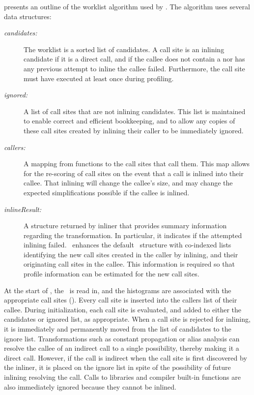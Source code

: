  presents an outline of the worklist
algorithm used by \FDI.  The algorithm uses several data structures:
\begin{description}

\item[{\it candidates:}] \hspace{15,5 pt}
  The worklist is a sorted list of candidates.
  A call site is an inlining candidate if it is a direct call, and if
  the callee does not contain a  nor has any previous
  attempt to inline the callee failed.  Furthermore, the call site
  must have executed at least once during profiling.

\item[{\it ignored:}] \hspace{5 pt}
  A list of call sites that are not inlining
  candidates.  This list is maintained to enable correct and efficient
  bookkeeping, and to allow any copies of these call sites created by
  inlining their caller to be immediately ignored.

\item[{\it callers:}] \hspace{2 pt}
  A mapping from functions to the call sites that
  call them.  This map allows for the re-scoring of call sites on the
  event that a call is inlined into their callee.  That inlining will
  change the callee's size, and may change the expected
  simplifications possible if the callee is inlined.

\item[{\it inlineResult:}] \hspace{19,5 pt}
  A structure returned by inliner that
  provides summary information regarding the transformation.  In
  particular, it indicates if the attempted inlining failed.
  \FDI\ enhances the default \llvm\ structure with co-indexed lists
  identifying the new call sites created in the caller by inlining,
  and their originating call sites in the callee.  This information is
  required so that profile information can be estimated for the new
  call sites.

\end{description}

At the start of \FDI, the \CProf\ is read in, and the histograms are
associated with the appropriate call sites ().  Every
call site is inserted into the callers list of their callee.  During
initialization, each call site is evaluated, and added to either the
candidates or ignored list, as appropriate.  When a call site is
rejected for inlining, it is immediately and permanently moved from
the list of candidates to the ignore list.  Transformations such as
constant propagation or alias analysis can resolve the callee of an
indirect call to a single possibility, thereby making it a direct
call.  However, if the call is indirect when the call site is first
discovered by the inliner, it is placed on the ignore list in spite of
the possibility of future inlining resolving the call.  Calls to
libraries and compiler built-in functions are also immediately ignored
because they cannot be inlined.

